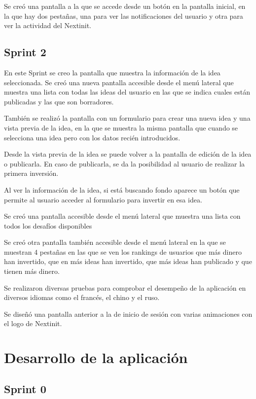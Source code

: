 Se creó una pantalla a la que se accede desde un botón en la pantalla inicial,
en la que hay dos pestañas, una para ver las notificaciones del usuario y otra para
ver la actividad del Nextinit.


\subsection{Sprint 2}

En este Sprint se creo la pantalla que muestra la información de la idea seleccionada. Se creó 
una nueva pantalla accesible desde el menú lateral que muestra una lista con todas las ideas 
del usuario en las que se indica cuales están publicadas y las que son borradores. 

También se realizó la pantalla con un formulario para crear una nueva idea y una vista previa 
de la idea, en la que se muestra la misma pantalla que cuando se selecciona una idea pero con 
los datos recién introducidos.

Desde la vista previa de la idea se puede volver a la pantalla de edición de la idea o publicarla. En 
caso de publicarla, se da la posibilidad al usuario de realizar la primera inversión.

Al ver la información de la idea, si está buscando fondo aparece un botón que permite al usuario 
acceder al formulario para invertir en esa idea.

Se creó una pantalla accesible desde el menú lateral que muestra una lista con todos los desafíos 
disponibles

Se creó otra pantalla también accesible desde el menú lateral en la que se muestran 4 pestañas en las que se 
ven los rankings de usuarios que más dinero han invertido, que en más ideas han invertido, 
que más ideas han publicado y que tienen más dinero.

Se realizaron diversas pruebas para comprobar el desempeño de la aplicación en diversos idiomas como 
el francés, el chino y el ruso.

Se diseñó una pantalla anterior a la de inicio de sesión con varias animaciones con el logo de Nextinit.

\section{Desarrollo de la aplicación}

\subsection{Sprint 0}

